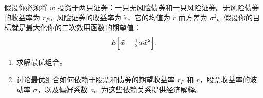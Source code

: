 \begin{samepage}
\begin{problem}
 假设你必须将 $w$ 投资于两只证券：一只无风险债券和一只风险证券。无风险债券的收益率为 $r_{F}$。风险证券的收益率为 $\tilde{r}$，它的均值为 $\bar{r}$ 而方差为 $\sigma^{2}$。假设你的目标就是最大化你的二次效用函数的期望值：
\[
    E\Bigl[\tilde{w}-\tfrac12 a\tilde{w}^{2}\Bigr].
\]
\begin{enumerate}[label=(\alph*)]
    \item 求解最优组合。
    \item 讨论最优组合如何依赖于股票和债券的期望收益率 $r_{F}$ 和 $\bar{r}$，股票收益率的波动率 $\sigma$，以及偏好系数 $a$。为这些依赖关系提供经济解释。
\end{enumerate}
\end{problem}
\end{samepage}
